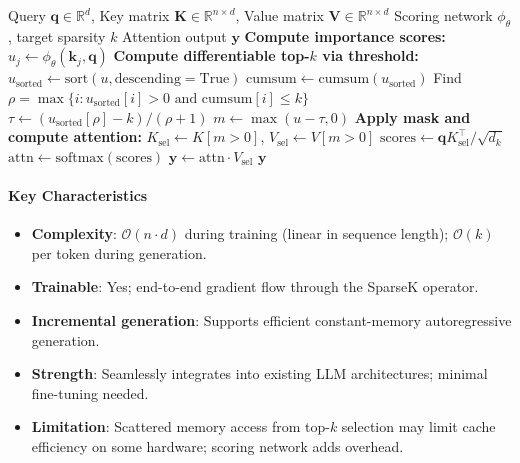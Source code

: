 \begin{algorithm}[H]
\caption{SparseK: Differentiable Top-$k$ Attention}
\begin{algorithmic}[1]
\Require Query $\mathbf{q} \in \mathbb{R}^d$, Key matrix $\mathbf{K} \in \mathbb{R}^{n \times d}$, Value matrix $\mathbf{V} \in \mathbb{R}^{n \times d}$
\Require Scoring network $\phi_\theta$, target sparsity $k$
\Ensure Attention output $\mathbf{y}$
\State \textbf{Compute importance scores:}
    \State $u_j \gets \phi_\theta(\mathbf{k}_j, \mathbf{q})$
\EndFor
\State \textbf{Compute differentiable top-$k$ via threshold:}
\State $u_{\text{sorted}} \gets \text{sort}(u, \text{descending}=\text{True})$
\State $\text{cumsum} \gets \text{cumsum}(u_{\text{sorted}})$
\State Find $\rho = \max\{i : u_{\text{sorted}}[i] > 0 \text{ and cumsum}[i] \leq k\}$
\State $\tau \gets (u_{\text{sorted}}[\rho] - k) / (\rho + 1)$ 
\State $m \gets \max(u - \tau, 0)$ 
\State \textbf{Apply mask and compute attention:}
\State $K_{\text{sel}} \gets K[m > 0]$, $V_{\text{sel}} \gets V[m > 0]$
\State $\text{scores} \gets \mathbf{q} K_{\text{sel}}^\top / \sqrt{d_k}$
\State $\text{attn} \gets \text{softmax}(\text{scores})$
\State $\mathbf{y} \gets \text{attn} \cdot V_{\text{sel}}$
\Return $\mathbf{y}$
\end{algorithmic}
\end{algorithm}

\paragraph{Key Characteristics}

\begin{itemize}[leftmargin=*]
    \item \textbf{Complexity}: $\mathcal{O}(n \cdot d)$ during training (linear in sequence length); $\mathcal{O}(k)$ per token during generation.
    \item \textbf{Trainable}: Yes; end-to-end gradient flow through the SparseK operator.
    \item \textbf{Incremental generation}: Supports efficient constant-memory autoregressive generation.
    \item \textbf{Strength}: Seamlessly integrates into existing LLM architectures; minimal fine-tuning needed.
    \item \textbf{Limitation}: Scattered memory access from top-$k$ selection may limit cache efficiency on some hardware; scoring network adds overhead.
\end{itemize}

